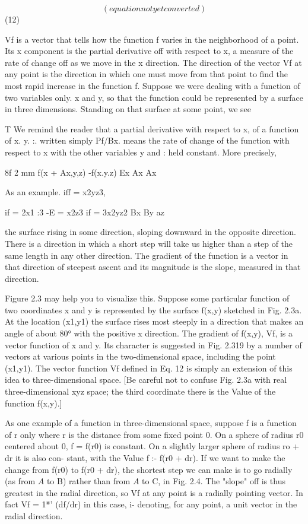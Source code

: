 \begin{equation}
(equation not yet converted)
\end{equation}
(12)

 

Vf is a vector that tells how the function f varies in the neighborhood
of a point. Its x component is the partial derivative off with respect
to x, a measure of the rate of change off as we move in the x direction.
The direction of the vector Vf at any point is the direction in which
one must move from that point to find the most rapid increase in the
function f. Suppose we were dealing with a function of two variables
only. x and y, so that the function could be represented by a surface
in three dimensions. Standing on that surface at some point, we see

T We remind the reader that a partial derivative with respect to x, of a function of
x. y. :. written simply Pf/Bx. means the rate of change of the function with respect to x
with the other variables y and : held constant. More precisely,

8f 2 mm f(x + Ax,y,z) -f(x.y.z)
Ex Ax Ax

As an example. iff = x2yz3,

if = 2x1 :3 -E = x2z3 if = 3x2yz2
Bx By az

the surface rising in some direction, sloping downward in the opposite
direction. There is a direction in which a short step will take us
higher than a step of the same length in any other direction. The
gradient of the function is a vector in that direction of steepest ascent
and its magnitude is the slope, measured in that direction.

Figure 2.3 may help you to visualize this. Suppose some particular
function of two coordinates x and y is represented by the surface
f(x,y) sketched in Fig. 2.3a. At the location (x1,y1) the surface rises
most steeply in a direction that makes an angle of about 80° with the
positive x direction. The gradient of f(x,y), Vf, is a vector function
of x and y. Its character is suggested in Fig. 2.319 by a number of
vectors at various points in the two-dimensional space, including the
point (x1,y1). The vector function Vf defined in Eq. 12 is simply an
extension of this idea to three-dimensional space. [Be careful not to
confuse Fig. 2.3a with real three-dimensional xyz space; the third
coordinate there is the Value of the function f(x,y).]

As one example of a function in three-dimensional space, suppose
f is a function of r only where r is the distance from some fixed
point 0. On a sphere of radius r0 centered about 0, f = f(r0) is
constant. On a slightly larger sphere of radius ro + dr it is also con-
stant, with the Value f :- f(r0 + dr). If we want to make the change
from f(r0) to f(r0 + dr), the shortest step we can make is to go
radially (as from $A$ to B) rather than from $A$ to C, in Fig. 2.4. The
"slope" off is thus greatest in the radial direction, so Vf at any point
is a radially pointing vector. In fact Vf = 1*' (df/dr) in this case,
i- denoting, for any point, a unit vector in the radial direction.

